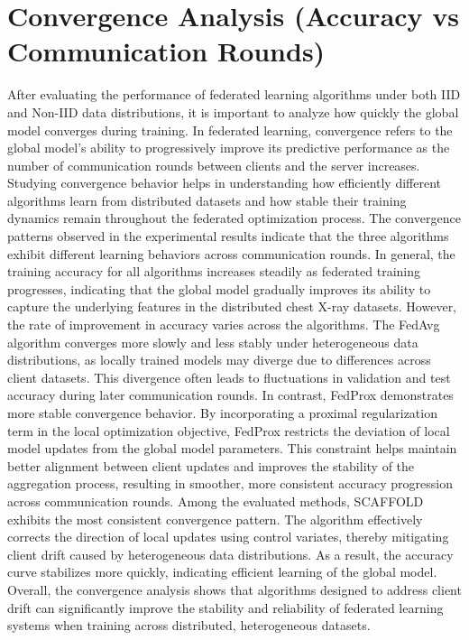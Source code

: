 \documentclass[12pt]{book}
\begin{document}
\section{Convergence Analysis (Accuracy vs Communication Rounds)}
After evaluating the performance of federated learning algorithms under both IID and Non-IID data distributions, it is important to analyze how quickly the global model converges during training. In federated learning, convergence refers to the global model's ability to progressively improve its predictive performance as the number of communication rounds between clients and the server increases. Studying convergence behavior helps in understanding how efficiently different algorithms learn from distributed datasets and how stable their training dynamics remain throughout the federated optimization process.
The convergence patterns observed in the experimental results indicate that the three algorithms exhibit different learning behaviors across communication rounds. In general, the training accuracy for all algorithms increases steadily as federated training progresses, indicating that the global model gradually improves its ability to capture the underlying features in the distributed chest X-ray datasets.
However, the rate of improvement in accuracy varies across the algorithms. The FedAvg algorithm converges more slowly and less stably under heterogeneous data distributions, as locally trained models may diverge due to differences across client datasets. This divergence often leads to fluctuations in validation and test accuracy during later communication rounds.
In contrast, FedProx demonstrates more stable convergence behavior. By incorporating a proximal regularization term in the local optimization objective, FedProx restricts the deviation of local model updates from the global model parameters. This constraint helps maintain better alignment between client updates and improves the stability of the aggregation process, resulting in smoother, more consistent accuracy progression across communication rounds.
Among the evaluated methods, SCAFFOLD exhibits the most consistent convergence pattern. The algorithm effectively corrects the direction of local updates using control variates, thereby mitigating client drift caused by heterogeneous data distributions. As a result, the accuracy curve stabilizes more quickly, indicating efficient learning of the global model.
Overall, the convergence analysis shows that algorithms designed to address client drift can significantly improve the stability and reliability of federated learning systems when training across distributed, heterogeneous datasets.
\end{document}
